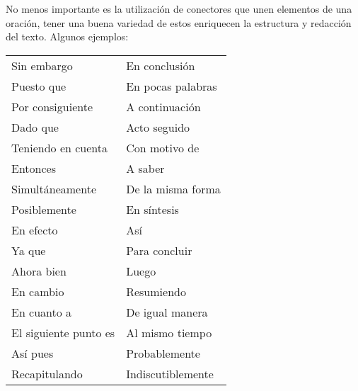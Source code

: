 No menos importante es la utilización de conectores que unen elementos de una oración, tener una buena variedad de estos enriquecen la estructura y redacción del texto. Algunos ejemplos:

\begin{tabular}{ll}
    Sin embargo         & En conclusión \\
    Puesto que          & En pocas palabras \\
    Por consiguiente    & A continuación \\
    Dado que            & Acto seguido \\
    Teniendo en cuenta  & Con motivo de \\
    Entonces            & A saber \\
    Simultáneamente     & De la misma forma \\
    Posiblemente        & En síntesis \\
    En efecto           & Así \\
    Ya que              & Para concluir \\
    Ahora bien          & Luego \\
    En cambio           & Resumiendo \\
    En cuanto a         & De igual manera \\
    El siguiente punto es& Al mismo tiempo \\
    Así pues            & Probablemente \\
    Recapitulando       & Indiscutiblemente 
\end{tabular}

\newpage